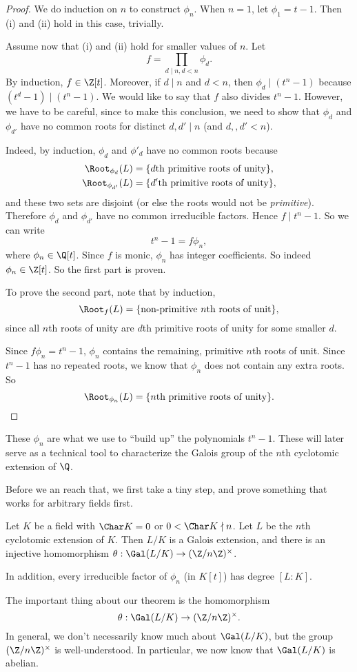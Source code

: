 \documentclass[a4paper]{article}
\begin{document}
\begin{proof}
  We do induction on $n$ to construct $\phi_n$. When $n = 1$, let $\phi_1 = t - 1$. Then (i) and (ii) hold in this case, trivially.

  Assume now that (i) and (ii) hold for smaller values of $n$. Let
  \[
    f = \prod_{d \mid n, d < n} \phi_d.
  \]
  By induction, $f \in \Z[t]$. Moreover, if $d \mid n$ and $d < n$, then $\phi_d \mid (t^n - 1)$ because $(t^d - 1) \mid (t^n - 1)$. We would like to say that $f$ also divides $t^n - 1$. However, we have to be careful, since to make this conclusion, we need to show that $\phi_d$ and $\phi_{d'}$ have no common roots for distinct $d, d' \mid n$ (and $d, ,d' < n$).

  Indeed, by induction, $\phi_d$ and $\phi'_d$ have no common roots because
  \begin{align*}
    \Root_{\phi_d}(L) &= \{d\text{th primitive roots of unity}\},\\
    \Root_{\phi_{d'}}(L) &= \{d'\text{th primitive roots of unity}\},
  \end{align*}
  and these two sets are disjoint (or else the roots would not be \emph{primitive}). Therefore $\phi_d$ and $\phi_{d'}$ have no common irreducible factors. Hence $f \mid t^n - 1$. So we can write
  \[
    t^n - 1 = f \phi_n,
  \]
  where $\phi_n \in \Q[t]$. Since $f$ is monic, $\phi_n$ has integer coefficients. So indeed $\phi_n \in \Z[t]$. So the first part is proven.

  To prove the second part, note that by induction,
  \[
    \Root_f(L) = \{\text{non-primitive }n\text{th roots of unit}\},
  \]
  since all $n$th roots of unity are $d$th primitive roots of unity for some smaller $d$.

  Since $f \phi_n = t^n - 1$, $\phi_n$ contains the remaining, primitive $n$th roots of unit. Since $t^n - 1$ has no repeated roots, we know that $\phi_n$ does not contain any extra roots. So
  \[
    \Root_{\phi_n}(L) = \{n\text{th primitive roots of unity}\}.
  \]
\end{proof}
These $\phi_n$ are what we use to ``build up'' the polynomials $t^n - 1$. These will later serve as a technical tool to characterize the Galois group of the $n$th cyclotomic extension of $\Q$.

Before we an reach that, we first take a tiny step, and prove something that works for arbitrary fields first.

\begin{thm}
  Let $K$ be a field with $\Char K = 0$ or $0 < \Char K \nmid n$. Let $L$ be the $n$th cyclotomic extension of $K$. Then $L/K$ is a Galois extension, and there is an injective homomorphism $\theta: \Gal(L/K) \to (\Z/n\Z)^\times$.

  In addition, every irreducible factor of $\phi_n$ (in $K[t]$) has degree $[L:K]$.
\end{thm}
The important thing about our theorem is the homomorphism
\[
  \theta: \Gal(L/K) \to (\Z/n\Z)^\times.
\]
In general, we don't necessarily know much about $\Gal(L/K)$, but the group $(\Z/n\Z)^\times$ is well-understood. In particular, we now know that $\Gal(L/K)$ is abelian.
\end{document}
